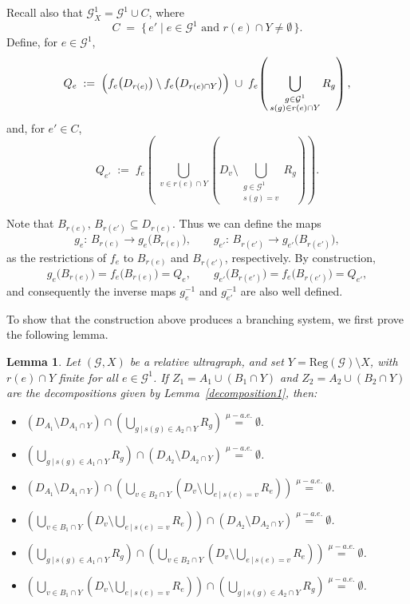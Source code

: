 \documentclass[12pt, reqno]{amsart}
\newtheorem{lemma}[theorem]{Lemma}
\theoremstyle{definition}
\theoremstyle{remark}
\numberwithin{equation}{section}
\begin{document}
Recall also that $\mathcal{G}_X^1=\mathcal{G}^1 \cup C$, where
\[
C \;=\; \{\, e' \mid e\in \mathcal{G}^1 \text{ and } r(e)\cap Y \neq \emptyset \,\}.
\]
Define, for $e\in \mathcal{G}^1$,
\[
Q_e
\;:=\;
\Bigl(f_e\bigl(D_{r(e)}\bigr)\setminus f_e\bigl(D_{r(e)\cap Y}\bigr)\Bigr)
\;\cup\;
f_e\!\left(\,\bigcup_{\substack{g \in \mathcal{G}^1 \\ s(g)\in r(e)\cap Y}} R_g \right),
\]
and, for $e'\in C$,
\[
Q_{e'}
\;:=\;
f_e\!\left(
\;\bigcup_{v \in r(e)\cap Y}
\left(
D_v \setminus \bigcup_{\substack{g \in \mathcal{G}^1 \\ s(g)=v}} R_g
\right)
\right).
\]

Note that $B_{r(e)},\,B_{r(e')}\subseteq D_{r(e)}$. Thus we can define the maps
\[
g_e:\, B_{r(e)} \longrightarrow g_e\bigl(B_{r(e)}\bigr),
\qquad
g_{e'}:\, B_{r(e')} \longrightarrow g_{e'}\bigl(B_{r(e')}\bigr),
\]
as the restrictions of $f_e$ to $B_{r(e)}$ and $B_{r(e')}$, respectively. By construction,
\[
g_e\bigl(B_{r(e)}\bigr)=f_e\bigl(B_{r(e)}\bigr)=Q_e,
\qquad
g_{e'}\bigl(B_{r(e')}\bigr)=f_e\bigl(B_{r(e')}\bigr)=Q_{e'},
\]
and consequently the inverse maps $g_e^{-1}$ and $g_{e'}^{-1}$ are also well defined.

To show that the construction above produces a branching system, we first prove the following
lemma.

\begin{lemma}\label{intersecao vazia}
Let $(\mathcal{G},X)$ be a relative ultragraph, and set $Y=\mathrm{Reg}(\mathcal{G})\setminus X$,
with $r(e)\cap Y$ finite for all $e\in \mathcal{G}^1$. If
$Z_1=A_1 \cup (B_1 \cap Y)$ and $Z_2=A_2 \cup (B_2 \cap Y)$ are the decompositions given by
Lemma~\ref{decomposition1}, then:
\begin{itemize}
    \item $( D_{A_1} \setminus D_{A_1 \cap Y} ) \cap \left( \bigcup\limits_{g \ | \ s(g) \in A_2 \cap Y} R_g \right)  \stackrel{\mu-a.e.}{=} \emptyset.$
    \item $ \left( \bigcup\limits_{g \ | \ s(g) \in A_1 \cap Y} R_g \right) \cap ( D_{A_2} \setminus D_{A_2 \cap Y} ) \stackrel{\mu-a.e.}{=} \emptyset$.
    \item $( D_{A_1} \setminus D_{A_1 \cap Y} ) \cap \left(  \bigcup\limits_{v \in B_2 \cap Y} \left(D_v \setminus \bigcup\limits_{ e \ | \ s(e) = v} R_e \right) \right) \stackrel{\mu-a.e.}{=} \emptyset$.
    \item $\left(  \bigcup\limits_{v \in B_1 \cap Y} \left(D_v \setminus \bigcup\limits_{ e \ | \ s(e) = v} R_e \right) \right) \cap ( D_{A_2} \setminus D_{A_2 \cap Y} ) \stackrel{\mu-a.e.}{=} \emptyset$.
    \item $\left( \bigcup\limits_{g \ | \ s(g) \in A_1 \cap Y} R_g \right) \cap \left(  \bigcup\limits_{v \in B_2 \cap Y} \left(D_v \setminus \bigcup\limits_{ e \ | \ s(e) = v} R_e \right) \right) \stackrel{\mu-a.e.}{=} \emptyset$.
     \item $ \left(  \bigcup\limits_{v \in B_1 \cap Y} \left(D_v \setminus \bigcup\limits_{ e \ | \ s(e) = v} R_e \right) \right) \cap \left( \bigcup\limits_{g \ | \ s(g) \in A_2 \cap Y} R_g \right) \stackrel{\mu-a.e.}{=} \emptyset$.
\end{itemize}  
\end{lemma}
\end{document}
